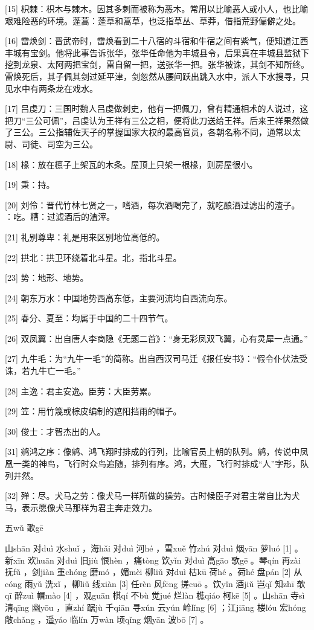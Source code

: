 \documentclass[12pt,UTF8]{ctexbook}
\begin{document}
[15] 枳棘：枳木与棘木。因其多刺而被称为恶木。常用以比喻恶人或小人，也比喻艰难险恶的环境。蓬蒿：蓬草和蒿草，也泛指草丛、草莽，借指荒野偏僻之处。

[16] 雷焕剑：晋武帝时，雷焕看到二十八宿的斗宿和牛宿之间有紫气，便知道江西丰城有宝剑。他将此事告诉张华，张华任命他为丰城县令，后果真在丰城县监狱下挖到龙泉、太阿两把宝剑，雷自留一把，送张华一把。张华被诛，其剑不知所终。雷焕死后，其子佩其剑过延平津，剑忽然从腰间跃出跳入水中，派人下水搜寻，只见水中有两条龙在戏水。

[17] 吕虔刀：三国时魏人吕虔做刺史，他有一把佩刀，曾有精通相术的人说过，这把刀“三公可佩”，吕虔认为王祥有三公之相，便将此刀送给王祥。后来王祥果然做了三公。三公指辅佐天子的掌握国家大权的最高官员，各朝名称不同，通常以太尉、司徒、司空为三公。

[18] 椽：放在檩子上架瓦的木条。屋顶上只架一根椽，则房屋很小。

[19] 秉：持。

[20] 刘伶：晋代竹林七贤之一，嗜酒，每次酒喝完了，就吃酿酒过滤出的渣子。 ：吃。糟：过滤酒后的渣滓。

[21] 礼别尊卑：礼是用来区别地位高低的。

[22] 拱北：拱卫环绕着北斗星。北，指北斗星。

[23] 势：地形、地势。

[24] 朝东万水：中国地势西高东低，主要河流均自西流向东。

[25] 春分、夏至：均属于中国的二十四节气。

[26] 双凤翼：出自唐人李商隐《无题二首》：“身无彩凤双飞翼，心有灵犀一点通。”

[27] 九牛毛：为“九牛一毛”的简称。出自西汉司马迁《报任安书》：“假令仆伏法受诛，若九牛亡一毛。”

[28] 主逸：君主安逸。臣劳：大臣劳累。

[29] 笠：用竹篾或棕皮编制的遮阳挡雨的帽子。

[30] 俊士：才智杰出的人。

[31] 鹓鸿之序：像鹓、鸿飞翔时排成的行列，比喻官员上朝的队列。鹓，传说中凤凰一类的神鸟，飞行时众鸟追随，排列有序。鸿，大雁，飞行时排成“人”字形，队列井然。

[32] 殚：尽。犬马之劳：像犬马一样所做的操劳。古时候臣子对君主常自比为犬马，表示愿像犬马那样为君主奔走效力。





五wǔ 歌gē


山shān 对duì 水shuǐ ，海hǎi 对duì 河hé ，雪xuě 竹zhú 对duì 烟yān 萝luó [1] 。新xīn 欢huān 对duì 旧jiù 恨hèn ，痛tòng 饮yǐn 对duì 高gāo 歌gē 。琴qín 再zài 抚fǔ ，剑jiàn 重chóng 磨mó ，媚mèi 柳liǔ 对duì 枯kū 荷hé 。荷hé 盘pán [2] 从cóng 雨yǔ 洗xǐ ，柳liǔ 线xiàn [3] 任rèn 风fēng 搓cuō 。饮yǐn 酒jiǔ 岂qǐ 知zhī 欹qī 醉zuì 帽mào [4] ，观guān 棋qí 不bù 觉jué 烂làn 樵qiáo 柯kē [5] 。山shān 寺sì 清qīng 幽yōu ，直zhí 踞jù 千qiān 寻xún 云yún 岭lǐng [6] ；江jiāng 楼lóu 宏hóng 敞chǎng ，遥yáo 临lín 万wàn 顷qǐng 烟yān 波bō [7] 。
\end{document}
